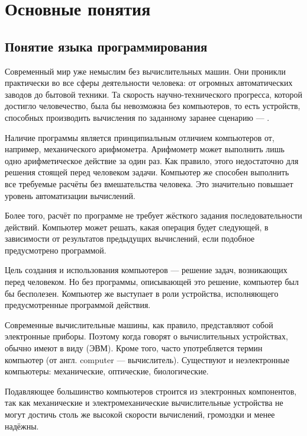 \chapter{Основные понятия}

\section{Понятие языка программирования}


Современный мир уже немыслим без вычислительных машин. Они проникли
практически во все сферы деятельности человека: от огромных
автоматических заводов до бытовой техники. Та скорость
научно-технического прогресса, которой достигло человечество, была бы
невозможна без компьютеров, то есть устройств, способных производить
вычисления по заданному заранее сценарию —
.

Наличие программы является принципиальным отличием компьютеров от,
например, механического арифмометра. Арифмометр может выполнить лишь
одно арифметическое действие за один раз. Как правило, этого
недостаточно для решения стоящей перед человеком задачи. Компьютер же
способен выполнить все требуемые расчёты без вмешательства
человека. Это значительно повышает уровень автоматизации вычислений.

Более того, расчёт по программе не требует жёсткого задания
последовательности действий. Компьютер может решать, какая операция
будет следующей, в зависимости от результатов предыдущих вычислений,
если подобное предусмотрено программой.

Цель создания и использования компьютеров — решение задач, возникающих
перед человеком. Но без программы, описывающей это решение, компьютер
был бы бесполезен. Компьютер же выступает в роли устройства,
исполняющего предусмотренные программой действия.

Современные вычислительные машины, как правило, представляют собой
электронные приборы. Поэтому когда говорят о вычислительных
устройствах, обычно имеют в виду  (ЭВМ).  Кроме
того, часто употребляется термин компьютер (от англ. computer —
вычислитель). Существуют и неэлектронные компьютеры: механические,
оптические, биологические.

Подавляющее большинство компьютеров строится из электронных
компонентов, так как механические и электромеханические вычислительные
устройства не могут достичь столь же высокой скорости вычислений,
громоздки и менее надёжны.

